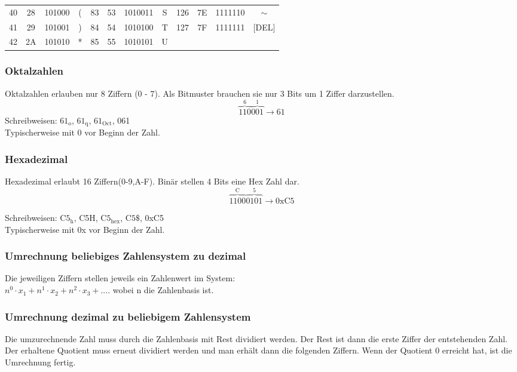 {{\begin{tabular}{cccc|cccc|cccc}
{\color[HTML]{9400FF} 40} & 28 & {\color[HTML]{9400FF} 101000} & ( & {\color[HTML]{9400FF} 83} & 53 & {\color[HTML]{9400FF} 1010011} & S & {\color[HTML]{9400FF} 126} & 7E & {\color[HTML]{9400FF} 1111110} & $\sim$ \\
{\color[HTML]{9400FF} 41} & 29 & {\color[HTML]{9400FF} 101001} & ) & {\color[HTML]{9400FF} 84} & 54 & {\color[HTML]{9400FF} 1010100} & T & {\color[HTML]{9400FF} 127} & 7F & {\color[HTML]{9400FF} 1111111} & {[}DEL{]} \\
{\color[HTML]{9400FF} 42} & 2A & {\color[HTML]{9400FF} 101010} & * & {\color[HTML]{9400FF} 85} & 55 & {\color[HTML]{9400FF} 1010101} & U &  &  &  & 
\end{tabular}%
}
}

\subsubsection{Oktalzahlen}

Oktalzahlen erlauben nur 8 Ziffern (0 - 7). Als Bitmuster brauchen sie nur 3 Bits um 1 Ziffer darzustellen.
\[
\overbrace{110}^\text{6} 
\overbrace{001}^\text{1} 
\rightarrow 61
\]
Schreibweisen: $61_{\text{o}}$, $61_{\text{q}}$, $61_{\text{Oct}}$, 061\\
Typischerweise mit 0 vor Beginn der Zahl.

\subsubsection{Hexadezimal}

Hexadezimal erlaubt 16 Ziffern(0-9,A-F). Binär stellen 4 Bits eine Hex Zahl dar.
\[
\overbrace{1100}^\text{C} 
\overbrace{0101}^\text{5} 
\rightarrow \text{0xC5}
\]

Schreibweisen: $\text{C5}_{\text{h}}$, C5H, $\text{C5}_{\text{hex}}$, $\text{C5}\$$, 0xC5\\
Typischerweise mit 0x vor Beginn der Zahl.

\subsubsection{Umrechnung beliebiges Zahlensystem zu dezimal}

Die jeweiligen Ziffern stellen jeweils ein Zahlenwert im System:\\ $n^0 \cdot x_1 + n^1 \cdot x_2 + n^2 \cdot x_3 + ....$ wobei n die Zahlenbasis ist.

\subsubsection{Umrechnung dezimal zu beliebigem Zahlensystem}

Die umzurechnende Zahl muss durch die Zahlenbasis mit Rest dividiert werden. Der Rest ist dann die erste Ziffer der entstehenden Zahl. Der erhaltene Quotient muss erneut dividiert werden und man erhält dann die folgenden Ziffern. Wenn der Quotient 0 erreicht hat, ist die Umrechnung fertig. 
